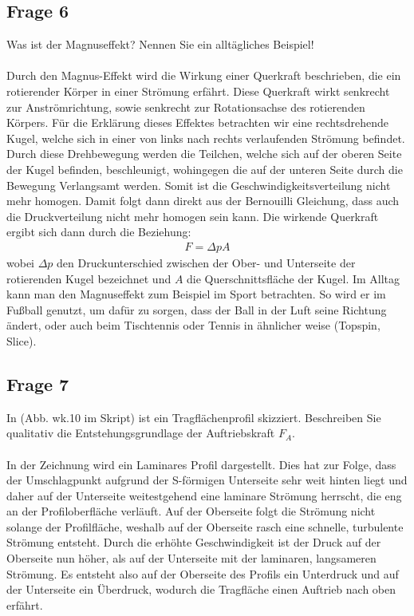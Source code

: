 \documentclass[a4paper,10pt]{scrartcl}
\begin{document}
		\subsection{Frage 6}
			Was ist der Magnuseffekt? Nennen Sie ein alltägliches Beispiel!\\
			\\
			Durch den Magnus-Effekt wird die Wirkung einer Querkraft beschrieben, die ein rotierender Körper in einer Strömung erfährt. Diese Querkraft wirkt senkrecht zur Anströmrichtung, sowie senkrecht zur Rotationsachse des rotierenden Körpers. Für die Erklärung dieses Effektes betrachten wir eine rechtsdrehende Kugel, welche sich in einer von links nach rechts verlaufenden Strömung befindet. Durch diese Drehbewegung werden die Teilchen, welche sich auf der oberen Seite der Kugel befinden, beschleunigt, wohingegen die auf der unteren Seite durch die Bewegung Verlangsamt werden. Somit ist die Geschwindigkeitsverteilung nicht mehr homogen. Damit folgt dann direkt aus der Bernouilli Gleichung, dass auch die Druckverteilung nicht mehr homogen sein kann. Die wirkende Querkraft ergibt sich dann durch die Beziehung:
			\begin{align*}
			F=\Delta p A
			\end{align*}
			wobei \(\Delta p\) den Druckunterschied zwischen der Ober- und Unterseite der rotierenden Kugel bezeichnet und \(A\) die Querschnittsfläche der Kugel. Im Alltag kann man den Magnuseffekt zum Beispiel im Sport betrachten. So wird er im Fußball genutzt, um dafür zu sorgen, dass der Ball in der Luft seine Richtung ändert, oder auch beim Tischtennis oder Tennis in ähnlicher weise (Topspin, Slice).
			
		\subsection{Frage 7}
			In (Abb. wk.10 im Skript) ist ein Tragflächenprofil skizziert. Beschreiben Sie qualitativ die Entstehungsgrundlage
			der Auftriebskraft \(F_{A}\).\\
			\\
			In der Zeichnung wird ein Laminares Profil dargestellt. Dies hat zur Folge, dass der Umschlagpunkt aufgrund der S-förmigen Unterseite sehr weit hinten liegt und daher auf der Unterseite weitestgehend eine laminare Strömung herrscht, die eng an der Profiloberfläche verläuft. Auf der Oberseite folgt die Strömung nicht solange der Profilfläche, weshalb auf der Oberseite rasch eine schnelle, turbulente Strömung entsteht. Durch die erhöhte Geschwindigkeit ist der Druck auf der Oberseite nun höher, als auf der Unterseite mit der laminaren, langsameren Strömung. Es entsteht also auf der Oberseite des Profils ein Unterdruck und auf der Unterseite ein Überdruck, wodurch die Tragfläche einen Auftrieb nach oben erfährt.
		
	
\end{document}
